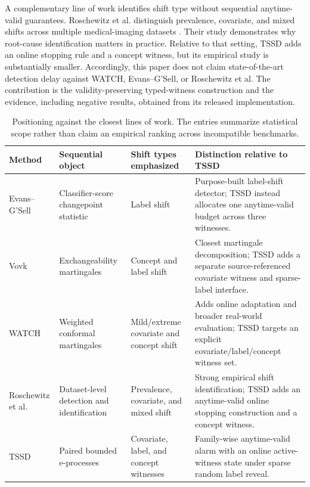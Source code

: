 \documentclass[11pt,a4paper]{article}
\theoremstyle{definition}
\newcommand{\1}{\mathbf{1}}
\begin{document}
A complementary line of work identifies shift type without sequential anytime-valid guarantees. Roschewitz et al. distinguish prevalence, covariate, and mixed shifts across multiple medical-imaging datasets \cite{roschewitz2025}. Their study demonstrates why root-cause identification matters in practice. Relative to that setting, TSSD adds an online stopping rule and a concept witness, but its empirical study is substantially smaller. Accordingly, this paper does not claim state-of-the-art detection delay against WATCH, Evans--G'Sell, or Roschewitz et al. The contribution is the validity-preserving typed-witness construction and the evidence, including negative results, obtained from its released implementation.

\begin{table}[t]
\centering
\caption{Positioning against the closest lines of work. The entries summarize statistical scope rather than claim an empirical ranking across incompatible benchmarks.}
\label{tab:position}
\small
\begin{tabular}{@{}>{\raggedright\arraybackslash}p{}>{\raggedright\arraybackslash}p{}>{\raggedright\arraybackslash}p{}>{\raggedright\arraybackslash}p{}@{}}
\toprule
Method & Sequential object & Shift types emphasized & Distinction relative to TSSD \\
\midrule
Evans--G'Sell \cite{evans2024} & Classifier-score changepoint statistic & Label shift & Purpose-built label-shift detector; TSSD instead allocates one anytime-valid budget across three witnesses. \\
Vovk \cite{vovk2020concept} & Exchangeability martingales & Concept and label shift & Closest martingale decomposition; TSSD adds a separate source-referenced covariate witness and sparse-label interface. \\
WATCH \cite{prinster2025watch} & Weighted conformal martingales & Mild/extreme covariate and concept shift & Adds online adaptation and broader real-world evaluation; TSSD targets an explicit covariate/label/concept witness set. \\
Roschewitz et al. \cite{roschewitz2025} & Dataset-level detection and identification & Prevalence, covariate, and mixed shift & Strong empirical shift identification; TSSD adds an anytime-valid online stopping construction and a concept witness. \\
TSSD & Paired bounded e-processes & Covariate, label, and concept witnesses & Family-wise anytime-valid alarm with an online active-witness state under sparse random label reveal. \\
\bottomrule
\end{tabular}
\end{table}
\end{document}
